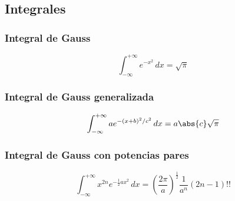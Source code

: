 \begin{summary}
    \subsection{Integrales}\label{subsec:integrales}
    \subsubsection*{Integral de Gauss}
    \begin{equation}
        \label{eq:integral-gauss}
         \int_{-\infty}^{+\infty} e^{-x^{2}}\,dx =\sqrt{\pi}
    \end{equation}
    
    \subsubsection*{Integral de Gauss generalizada}
    \begin{equation}
        \label{eq:integral-gauss-generalizada}
         \int_{-\infty}^{+\infty} ae^{-(x+b)^{2}/c^2}\,dx =a\abs{c}\sqrt{\pi}
    \end{equation}

    \subsubsection*{Integral de Gauss con potencias pares}
    \begin{equation}
        \label{eq:integral-gauss-generalizada-potencias-pares}
         \int_{-\infty}^{+\infty} x^{2n}e^{-\frac{1}{2}ax^{2}}\,dx =\left(\frac{2\pi}{a}\right)^{\frac{1}{2}}\frac{1}{a^n}(2n-1)!!
    \end{equation}

\end{summary}